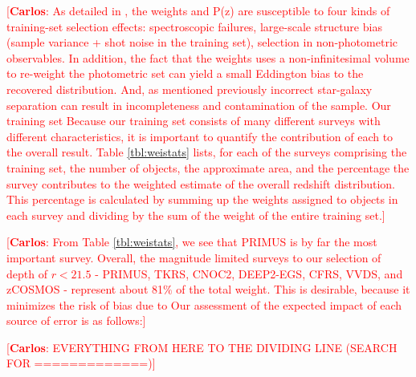 \documentclass[preprint]{aastex}
\newcommand{\cc}[1]{\textcolor{red}{[{\bf Carlos}: #1]}}
\begin{document}
\cc{As detailed in \cite{CunhaPhotoz09}, the weights and P(z) are susceptible to 
four kinds of training-set selection effects: spectroscopic failures, large-scale structure 
bias (sample variance + shot noise in the training set), selection in non-photometric observables.
In addition, the fact that the weights uses a non-infinitesimal volume to re-weight the photometric
set can yield a small Eddington bias to the recovered distribution. 
And, as mentioned previously incorrect star-galaxy separation can result in incompleteness and contamination 
of the sample. 
Our training set 
Because our training set consists of many different surveys with different 
characteristics, it is important to quantify the contribution of each to the 
overall result.
Table \ref{tbl:weistats} lists, for each of the surveys comprising the training 
set, the number of objects, the approximate area, and the percentage the survey 
contributes to the weighted estimate of the overall redshift distribution. 
This percentage is calculated by summing up the weights assigned to objects in 
each survey and dividing by the sum of the weight of the entire training set.}


\cc{From Table \ref{tbl:weistats}, we see that PRIMUS is by far the most important survey.
Overall, the magnitude limited surveys to our selection of depth of $r<21.5$ - PRIMUS, TKRS, CNOC2, DEEP2-EGS, CFRS, VVDS, and zCOSMOS -
represent about 81$\%$ of the total weight.
This is desirable, because it minimizes the risk of bias due to   
Our assessment of the expected impact of each source of error is as follows:}

\cc{EVERYTHING FROM HERE TO THE DIVIDING LINE (SEARCH FOR =============)}
\end{document}
